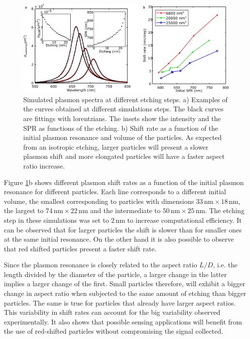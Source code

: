 \documentclass[a4paper,oneside,onecolumn]{article}
\newcommand{\nm}{\ensuremath{\,\textrm{nm}}}
\begin{document}
\begin{figure}[p]
 \centering
 \includegraphics[width=0.95\linewidth]{Figures/02_Simulations/simulations.png}
 \caption{Simulated plasmon spectra at different etching steps. a) Examples of
 the curves obtained at different simulations steps. The black curves are
 fittings with lorentzians. The insets show the intensity and the SPR as
 functions of the etching. b) Shift rate as a function of the initial
 plasmon resonance and volume of the particles. As expected from an isotropic etching, larger particles will present a slower plasmon shift and more elongated particles will have a faster aspect ratio increase.}
 \label{fig:simulations}
\end{figure}

Figure \ref{fig:simulations}b shows different plasmon shift rates as a function of the initial plasmon resonance for different
particles. Each line corresponds to a different initial volume, the smallest corresponding to particles with dimensions $33\nm\times18\nm$, the largest to $74\nm\times22\nm$ and the intermediate to $50\nm\times25\nm$. The etching step in these simulations was set to $2\nm$ to increase computational efficiency. It can be observed that for larger particles the shift is slower than for smaller ones at the same initial resonance. On the other hand it is also possible to observe that red shifted particles present a faster shift rate.

Since the plasmon resonance is closely related to the aspect ratio $L/D$, i.e. the length divided by the diameter of the particle, a larger change in the latter implies a larger change of the first. Small particles therefore, will exhibit a bigger change in aspect ratio when subjected to the same amount of etching than bigger particles. The same is true for particles that already have larger aspect ratios. This variability in shift rates can account for the big variability observed experimentally. It also shows that possible sensing applications will benefit from the use of red-shifted particles without compromising the signal collected.
\end{document}
